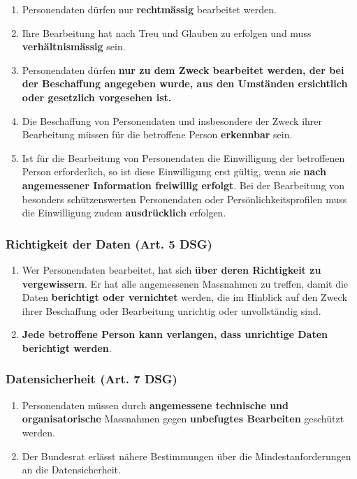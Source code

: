 \begin{enumerate}
	\tightlist
	\item Personendaten dürfen nur \textbf{rechtmässig} bearbeitet werden.
	\item Ihre Bearbeitung hat nach Treu und Glauben zu erfolgen und muss
	\textbf{verhältnismässig} sein.
	\item Personendaten dürfen \textbf{nur zu dem Zweck bearbeitet werden, der
	bei der Beschaffung angegeben wurde, aus den Umständen ersichtlich
	oder gesetzlich vorgesehen ist.}
	\item Die Beschaffung von Personendaten und insbesondere der Zweck ihrer
	Bearbeitung müssen für die betroffene Person \textbf{erkennbar} sein.
	\item Ist für die Bearbeitung von Personendaten die Einwilligung der
	betroffenen Person erforderlich, so ist diese Einwilligung erst
	gültig, wenn sie \textbf{nach angemessener Information freiwillig
	erfolgt}. Bei der Bearbeitung von besonders schützenswerten
	Personendaten oder Persönlichkeitsprofilen muss die Einwilligung zudem
	\textbf{ausdrücklich} erfolgen.
\end{enumerate}


\subsubsection{Richtigkeit der Daten (Art. 5 DSG)}
\label{sec:Datenschutz-Richtigkeit}

\begin{enumerate}
	\tightlist
	\item Wer Personendaten bearbeitet, hat sich \textbf{über deren Richtigkeit
	zu vergewissern}. Er hat alle angemessenen Massnahmen zu treffen,
	damit die Daten \textbf{berichtigt oder vernichtet} werden, die im
	Hinblick auf den Zweck ihrer Beschaffung oder Bearbeitung unrichtig
	oder unvollständig sind.
	\item \textbf{Jede betroffene Person kann verlangen, dass unrichtige Daten
	berichtigt werden}.
\end{enumerate}

\subsubsection{Datensicherheit (Art. 7 DSG)}
\label{sec:Datenschutz-Datensicherheit}

\begin{enumerate}
	\tightlist
	\item Personendaten müssen durch \textbf{angemessene technische und
	organisatorische} Massnahmen gegen \textbf{unbefugtes Bearbeiten}
	geschützt werden.
	\item Der Bundesrat erlässt nähere Bestimmungen über die
	Mindestanforderungen an die Datensicherheit.
\end{enumerate}


